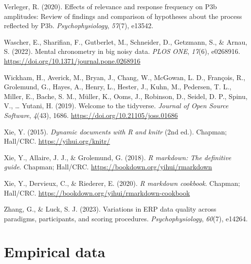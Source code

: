 \documentclass[
  man]{apa7}
\newlength{\cslhangindent}
\newlength{\cslentryspacingunit} %
\newenvironment{CSLReferences}[2] %
 {%
  \setlength{\parindent}{0pt}
  \ifodd #1
  \let\oldpar\par
  \def\par{\hangindent=\cslhangindent\oldpar}
  \fi
  \setlength{\parskip}{#2\cslentryspacingunit}
 }%
 {}
\begin{document}
\begin{CSLReferences}{1}{0}
\leavevmode{}%
Verleger, R. (2020). Effects of relevance and response frequency on {P3b} amplitudes: {Review} of findings and comparison of hypotheses about the process reflected by {P3b}. \emph{Psychophysiology}, \emph{57}(7), e13542.

\leavevmode{}%
Wascher, E., Sharifian, F., Gutberlet, M., Schneider, D., Getzmann, S., \& Arnau, S. (2022). Mental chronometry in big noisy data. \emph{PLOS ONE}, \emph{17}(6), e0268916. \url{https://doi.org/10.1371/journal.pone.0268916}

\leavevmode{}%
Wickham, H., Averick, M., Bryan, J., Chang, W., McGowan, L. D., François, R., Grolemund, G., Hayes, A., Henry, L., Hester, J., Kuhn, M., Pedersen, T. L., Miller, E., Bache, S. M., Müller, K., Ooms, J., Robinson, D., Seidel, D. P., Spinu, V., \ldots{} Yutani, H. (2019). Welcome to the {tidyverse}. \emph{Journal of Open Source Software}, \emph{4}(43), 1686. \url{https://doi.org/10.21105/joss.01686}

\leavevmode{}%
Xie, Y. (2015). \emph{Dynamic documents with {R} and knitr} (2nd ed.). Chapman; Hall/CRC. \url{https://yihui.org/knitr/}

\leavevmode{}%
Xie, Y., Allaire, J. J., \& Grolemund, G. (2018). \emph{R markdown: The definitive guide}. Chapman; Hall/CRC. \url{https://bookdown.org/yihui/rmarkdown}

\leavevmode{}%
Xie, Y., Dervieux, C., \& Riederer, E. (2020). \emph{R markdown cookbook}. Chapman; Hall/CRC. \url{https://bookdown.org/yihui/rmarkdown-cookbook}

\leavevmode{}%
Zhang, G., \& Luck, S. J. (2023). Variations in {ERP} data quality across paradigms, participants, and scoring procedures. \emph{Psychophysiology}, \emph{60}(7), e14264.

\end{CSLReferences}

\newpage

\hypertarget{appendix-appendix}{%
\appendix}


\hypertarget{empirical-data}{%
\section{Empirical data}\label{empirical-data}}
\end{document}
